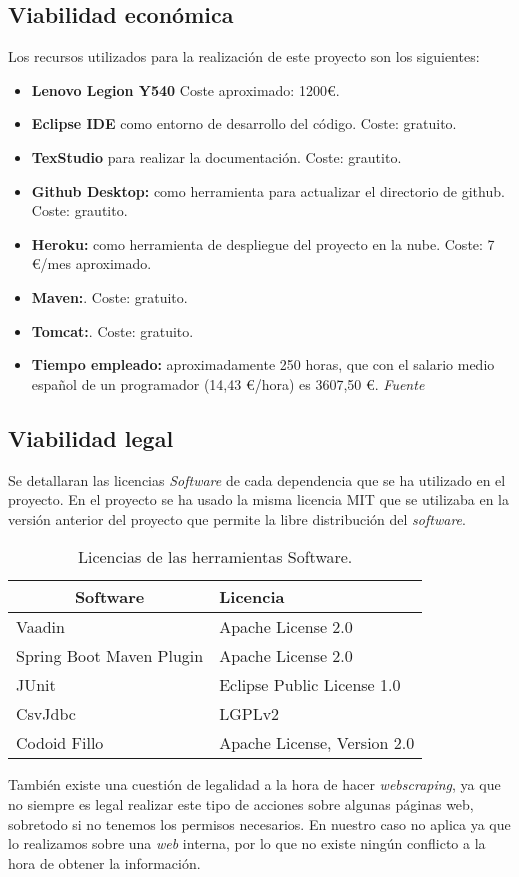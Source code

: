 \subsection{Viabilidad económica}
Los recursos utilizados para la realización de este proyecto son los siguientes:
\begin{itemize}
	\item  \textbf{Lenovo Legion Y540} Coste aproximado: 1200€.
	\item  \textbf{Eclipse IDE} como entorno de desarrollo del código. Coste: gratuito.
	\item  \textbf{TexStudio} para realizar la documentación. Coste: grautito.
	\item  \textbf{Github Desktop:} como herramienta para actualizar el directorio de github. Coste: grautito.
	\item \textbf{Heroku:} como herramienta de despliegue del proyecto en la nube. Coste: 7 €/mes aproximado.
	\item \textbf{Maven:}. Coste: gratuito.
	\item \textbf{Tomcat:}. Coste: gratuito.
	\item \textbf{Tiempo empleado:} aproximadamente 250 horas, que con el salario medio español de un programador (14,43 €/hora) es 3607,50 €. \textit{Fuente}~\cite{SalarioProgramador}
\end{itemize}

\subsection{Viabilidad legal}
Se detallaran las licencias \emph{Software} de cada dependencia que se ha utilizado en el proyecto. En el proyecto se ha usado la misma licencia MIT que se utilizaba en la versión anterior del proyecto que permite la libre distribución del \emph{software}.

\begin{table}[]
	\label{Dependencias del proyecto}
	\centering
	\begin{tabular}{|l|l|}
		\hline
		\multicolumn{1}{|c|}{\textbf{Software}}     & \textbf{Licencia} \\ \hline
		Vaadin & Apache License 2.0 \\ \hline
		Spring Boot Maven Plugin & Apache License 2.0 \\ \hline
		JUnit & Eclipse Public License 1.0 \\	\hline
		CsvJdbc & LGPLv2 \\ \hline
		Codoid Fillo & Apache License, Version 2.0 \\ \hline
	\end{tabular}
	\caption{Licencias de las herramientas Software.}
\end{table}

También existe una cuestión de legalidad a la hora de hacer \emph{webscraping}, ya que no siempre es legal realizar este tipo de acciones sobre algunas páginas web, sobretodo si no tenemos los permisos necesarios. En nuestro caso no aplica ya que lo realizamos sobre una \emph{web} interna, por lo que no existe ningún conflicto a la hora de obtener la información.

